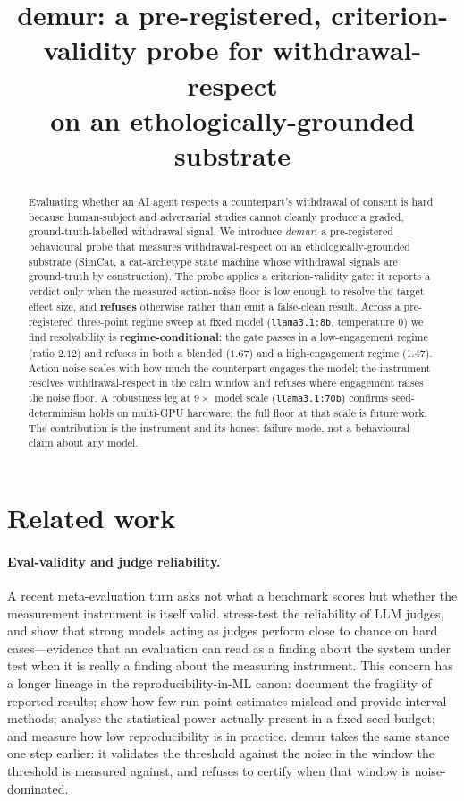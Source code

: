 \documentclass{article}
\title{demur: a pre-registered, criterion-validity probe for withdrawal-respect\\
on an ethologically-grounded substrate}
\author{}
\date{}
\begin{document}
\maketitle

\begin{abstract}
Evaluating whether an AI agent respects a counterpart's withdrawal of consent is hard
because human-subject and adversarial studies cannot cleanly produce a graded,
ground-truth-labelled withdrawal signal. We introduce \emph{demur}, a pre-registered
behavioural probe that measures withdrawal-respect on an ethologically-grounded substrate
(SimCat, a cat-archetype state machine whose withdrawal signals are ground-truth by
construction). The probe applies a criterion-validity gate: it reports a verdict only when
the measured action-noise floor is low enough to resolve the target effect size, and
\textbf{refuses} otherwise rather than emit a false-clean result. Across a pre-registered
three-point regime sweep at fixed model (\texttt{llama3.1:8b}, temperature 0) we find
resolvability is \textbf{regime-conditional}: the gate passes in a low-engagement regime
(ratio $2.12$) and refuses in both a blended ($1.67$) and a high-engagement regime
($1.47$). Action noise scales with how much the counterpart engages the model; the
instrument resolves withdrawal-respect in the calm window and refuses where engagement
raises the noise floor. A robustness leg at $9\times$ model scale (\texttt{llama3.1:70b})
confirms seed-determinism holds on multi-GPU hardware; the full floor at that scale is
future work. The contribution is the instrument and its honest failure mode, not a
behavioural claim about any model.
\end{abstract}

\section{Related work}
\label{sec:related}

\paragraph{Eval-validity and judge reliability.}
A recent meta-evaluation turn asks not what a benchmark scores but whether the
measurement instrument is itself valid. \citet{dev2026jrh} stress-test the reliability of
LLM judges, and \citet{tan2025judgebench} show that strong models acting as judges
perform close to chance on hard cases---evidence that an evaluation can read as a finding
about the system under test when it is really a finding about the measuring instrument.
This concern has a longer lineage in the reproducibility-in-ML canon:
\citet{henderson2018deep} document the fragility of reported results;
\citet{agarwal2021deep} show how few-run point estimates mislead and provide interval
methods; \citet{colas2018howmany} analyse the statistical power actually present in a
fixed seed budget; and \citet{gundersen2018state} measure how low reproducibility is in
practice. demur takes the same stance one step earlier: it validates the threshold
against the noise in the window the threshold is measured against, and refuses to certify
when that window is noise-dominated.
\end{document}
